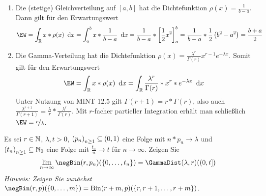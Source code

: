 \begin{exercisePage}
	\begin{enumerate}[leftmargin=*, label=(zu \alph*)]
		\item Die (stetige) Gleichverteilung auf $[a,b]$ hat die Dichtefunktion $\rho(x) = \frac{1}{b-a}$. Dann gilt für den Erwartungswert
		\begin{equation*}
			\EW = \int_\R x * \rho(x) \dx = \int_a^b x * \frac{1}{b-a} \dx = \frac{1}{b-a} * \left[ \frac{1}{2} x^2 \right]_a^b = \frac{1}{b-a} * \frac{1}{2} \left( b^2 - a^2 \right) = \frac{b+a}{2}
		\end{equation*}
		\item Die Gamma-Verteilung hat die Dichtefunktion $\rho(x) = \frac{\lambda^r}{\Gamma(r)} x^{r-1} e^{-\lambda x}$. Somit gilt für den Erwartungswert
		\begin{equation*}
			\EW = \int_\R x * \rho(x) \dx = \int_\R \frac{\lambda^r}{\Gamma(r)} * x^r * e^{-\lambda x} \dx
		\end{equation*}
		Unter Nutzung von MINT 12.5 gilt $\Gamma(r+1) = r * \Gamma(r)$, also auch $\frac{\lambda^{r+1}}{\Gamma(r+1)} = \frac{\lambda}{r} * \frac{\lambda^r}{\Gamma(r)}$. Mit $r$-facher partieller Integration erhält man schließlich $\EW = \lfrac{r}{\lambda}$.
	\end{enumerate}

	\begin{homework}
		Es sei $r \in \mathbb{N}$, $\lambda,t > 0$, $\folge{p_n}[n \geq 1] \subseteq (0,1)$ eine Folge mit $n * p_n \to \lambda$ und $\folge{t_n}[n \geq 1] \subseteq \N_0$ eine Folge mit $\frac{t_n}{n} \to t$ für $n \to \infty$. Zeigen Sie
		\begin{equation*}
			\lim_{n \to \infty} \negBin(r,p_n)(\menge{0, \dots , t_n}) = \GammaDist(\lambda,r)((0,t])
		\end{equation*}
		\textit{Hinweis: Zeigen Sie zunächst $\negBin(r,p)(\menge{0, \dots , m}) = \Bin(r+m,p)(\menge{r, r+1 , \dots , r+m})$.}
	\end{homework}
\end{exercisePage}